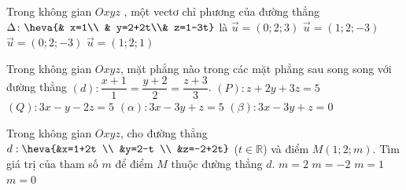 \begin{ex}%
Trong không gian $Oxyz$ , một vectơ chỉ phương của đường thẳng
$\Delta\colon \heva{& x=1\\ & y=2+2t\\&     z=1-3t}$ là
\choice
{$\vec{u}=\left(0;2;3\right)$}
{$\vec{u}=\left(1;2;-3\right)$}
{\True $\vec{u}=\left(0;2;-3\right)$}
{$\vec{u}=\left(1;2;1\right)$}
\end{ex}

\begin{ex}%
Trong không gian $Oxyz$, mặt phẳng nào trong các mặt phẳng sau song song với đường thẳng
$(d)\colon  \dfrac{x+1}{1}=\dfrac{y+2}{2}=\dfrac{z+3}{3}$.
\choice
{$(P)\colon  z+2 y+3 z=5$}
{$(Q)\colon  3 x-y-2 z=5$}
{\True $(\alpha)\colon  3 x-3 y+z=5$}
{$(\beta)\colon  3 x-3 y+z=0$}
\end{ex}

\begin{ex}%
Trong không gian $Oxyz$, cho đường thẳng $d: \heva{&x=1+2t \\ &y=2-t \\ &z=-2+2t}$ ($t\in\mathbb{R}$) và điểm $M(1;2;m)$. Tìm giá trị của tham số $m$ để điểm $M$ thuộc đường thẳng $d$.
\choice
{$m=2$}
{\True $m=-2$}
{$m=1$}
{$m=0$}
\end{ex}

